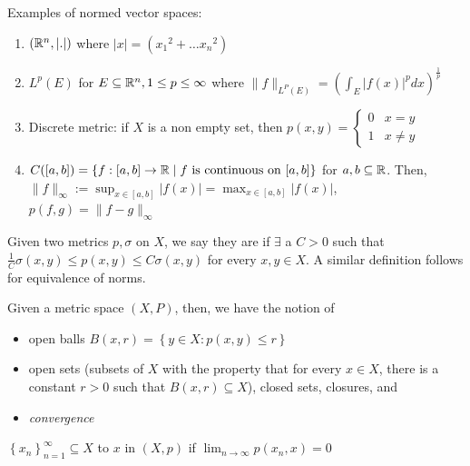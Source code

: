 \begin{exmp} Examples of normed vector spaces:
    \begin{enumerate}
        \item $(\mathbb{R}^n, \left| . \right| )$ where $\left| x \right| = ({x_1}^2 + \dots {x_n}^2)$
        \item $L^p(E)$ for $E \subseteq \mathbb{R}^n, 1 \leq p \leq \infty $ where $\| f \|_{L^P(E)} =  
        (\int_{E}^{}\left| f(x) \right|^p dx)^{\frac{1}{p}}$ 
        \item Discrete metric: if $X$ is a non empty set, then $p(x,y) = \begin{cases}
            0 & x = y \\
            1 & x \neq y
        \end{cases} $
        \item $C([a, b]) = \left\{ f : [a,b] \to \mathbb{R} \mid f \text{ is continuous on }  [a,b] \right\} $ 
        for $a, b \subseteq \mathbb{R}$. Then, $\| f \|_{\infty} := \sup_{x \in [a,b]} \left| f(x) \right| =
        \max_{x \in [a,b]} \left| f(x) \right|$,  $p(f,g) = \| f - g \|_{\infty} $
    \end{enumerate}
\end{exmp}

\begin{defn}
    Given two metrics $p, \sigma$ on $X$, we say they are  if
    $\exists$ a $C > 0$ such that 
    $\frac{1}{C}\sigma(x,y) \leq p(x,y) \leq C\sigma(x,y)$ for every $x,y \in X$.
    A similar definition follows for equivalence of norms.     
\end{defn}

\noindent Given a metric space $(X, P)$, then, we have the notion of
\begin{itemize}
    \item open balls $B(x,r) = \left\{ y \in X : p(x,y) \leq r \right\} $ 
    \item open sets (subsets of $X$ with the property that for every $x \in X$, there is a constant
    $r > 0$ such that $B(x,r) \subseteq X$), closed sets, closures, and
    \item \textit{convergence} 
\end{itemize}

\begin{defn}[Convergence]
    $\left\{ x_n \right\}_{n = 1}^{\infty} \subseteq X $  to $x$ in $(X, p)$ if 
    $\lim_{n \to \infty} p(x_n, x) = 0$  
\end{defn}

